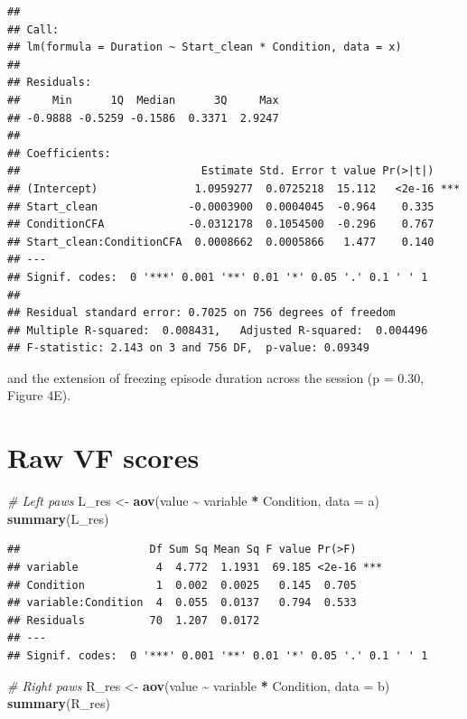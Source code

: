 \documentclass[
]{book}
\newenvironment{Shaded}{\begin{snugshade}}{\end{snugshade}}
\newcommand{\AttributeTok}[1]{\textcolor[rgb]{0.13,0.29,0.53}{#1}}
\newcommand{\CommentTok}[1]{\textcolor[rgb]{0.56,0.35,0.01}{\textit{#1}}}
\newcommand{\FunctionTok}[1]{\textcolor[rgb]{0.13,0.29,0.53}{\textbf{#1}}}
\newcommand{\NormalTok}[1]{#1}
\newcommand{\OtherTok}[1]{\textcolor[rgb]{0.56,0.35,0.01}{#1}}
\newcommand{\SpecialCharTok}[1]{\textcolor[rgb]{0.81,0.36,0.00}{\textbf{#1}}}
\begin{document}
\begin{verbatim}
## 
## Call:
## lm(formula = Duration ~ Start_clean * Condition, data = x)
## 
## Residuals:
##     Min      1Q  Median      3Q     Max 
## -0.9888 -0.5259 -0.1586  0.3371  2.9247 
## 
## Coefficients:
##                            Estimate Std. Error t value Pr(>|t|)    
## (Intercept)               1.0959277  0.0725218  15.112   <2e-16 ***
## Start_clean              -0.0003900  0.0004045  -0.964    0.335    
## ConditionCFA             -0.0312178  0.1054500  -0.296    0.767    
## Start_clean:ConditionCFA  0.0008662  0.0005866   1.477    0.140    
## ---
## Signif. codes:  0 '***' 0.001 '**' 0.01 '*' 0.05 '.' 0.1 ' ' 1
## 
## Residual standard error: 0.7025 on 756 degrees of freedom
## Multiple R-squared:  0.008431,   Adjusted R-squared:  0.004496 
## F-statistic: 2.143 on 3 and 756 DF,  p-value: 0.09349
\end{verbatim}

and the extension of freezing episode duration across the session (p = 0.30, Figure 4E).

\section*{Raw VF scores}\label{raw-vf-scores}

\begin{Shaded}
\begin{Highlighting}[]
\CommentTok{\# Left paws}
\NormalTok{L\_res }\OtherTok{\textless{}{-}} \FunctionTok{aov}\NormalTok{(value }\SpecialCharTok{\textasciitilde{}}\NormalTok{ variable }\SpecialCharTok{*}\NormalTok{ Condition, }\AttributeTok{data =}\NormalTok{ a)}
\FunctionTok{summary}\NormalTok{(L\_res)}
\end{Highlighting}
\end{Shaded}

\begin{verbatim}
##                    Df Sum Sq Mean Sq F value Pr(>F)    
## variable            4  4.772  1.1931  69.185 <2e-16 ***
## Condition           1  0.002  0.0025   0.145  0.705    
## variable:Condition  4  0.055  0.0137   0.794  0.533    
## Residuals          70  1.207  0.0172                   
## ---
## Signif. codes:  0 '***' 0.001 '**' 0.01 '*' 0.05 '.' 0.1 ' ' 1
\end{verbatim}

\begin{Shaded}
\begin{Highlighting}[]
\CommentTok{\# Right paws}
\NormalTok{R\_res }\OtherTok{\textless{}{-}} \FunctionTok{aov}\NormalTok{(value }\SpecialCharTok{\textasciitilde{}}\NormalTok{ variable }\SpecialCharTok{*}\NormalTok{ Condition, }\AttributeTok{data =}\NormalTok{ b)}
\FunctionTok{summary}\NormalTok{(R\_res)}
\end{Highlighting}
\end{Shaded}
\end{document}
